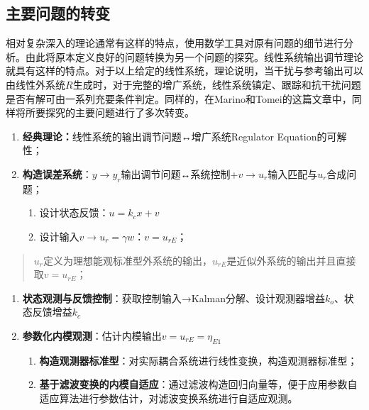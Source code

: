 \documentclass[
  12pt,
  a4paper
]{article}
\begin{document}
\subsection{主要问题的转变}\label{ux4e3bux8981ux95eeux9898ux7684ux8f6cux53d8}

相对复杂深入的理论通常有这样的特点，使用数学工具对原有问题的细节进行分析。由此将原本定义良好的问题转换为另一个问题的探究。线性系统输出调节理论就具有这样的特点。对于以上给定的线性系统，理论说明，当干扰与参考输出可以由线性外系统\(R\)生成时，对于完整的增广系统，线性系统镇定、跟踪和抗干扰问题是否有解可由一系列充要条件判定。同样的，在Marino和Tomei的这篇文章中，同样将所要探究的主要问题进行了多次转变。

\begin{enumerate}
\def\labelenumi{\arabic{enumi}.}
\item
  \textbf{经典理论：}线性系统的输出调节问题↔增广系统Regulator
  Equation的可解性；
\item
  \textbf{构造误差系统}：\(y \rightarrow y_{r}\)输出调节问题↔系统控制+\(v \rightarrow u_{r}\)输入匹配与\(u_{r}\)合成问题；

  \begin{enumerate}
  \def\labelenumii{\alph{enumii})}
  \item
    设计状态反馈：\(u = k_{c}x + v\)
  \item
    设计输入\(v \rightarrow u_{r} = \gamma w\)：\(v = u_{rE}\)；
  \end{enumerate}
\end{enumerate}

\begin{quote}
\(u_{r}\)定义为理想能观标准型外系统的输出，\(u_{rE}\)是近似外系统的输出并且直接取\(v = u_{rE}\)；
\end{quote}

\begin{enumerate}
\def\labelenumi{\arabic{enumi}.}
\setcounter{enumi}{2}
\item
  \textbf{状态观测与反馈控制}：获取控制输入→Kalman分解、设计观测器增益\(k_{o}\)、状态反馈增益\(k_{c}\)
\item
  \textbf{参数化内模观测}：估计内模输出\(v = u_{rE} = \eta_{E1}\)

  \begin{enumerate}
  \def\labelenumii{\alph{enumii})}
  \item
    \textbf{构造观测器标准型}：对实际耦合系统进行线性变换，构造观测器标准型；
  \item
    \textbf{基于滤波变换的内模自适应}：通过滤波构造回归向量等，便于应用参数自适应算法进行参数估计，对滤波变换系统进行自适应观测。
  \end{enumerate}
\end{enumerate}
\end{document}
